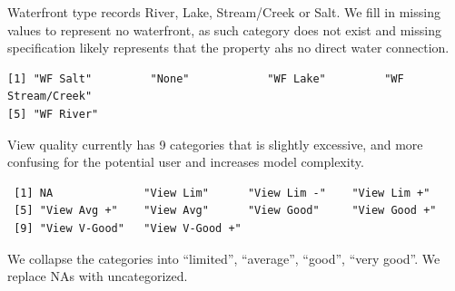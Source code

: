 \documentclass[
  english,
  letterpaper,
  DIV=11,
  numbers=noendperiod]{scrreprt}
\newenvironment{Shaded}{\begin{snugshade}}{\end{snugshade}}
\newcommand{\AttributeTok}[1]{\textcolor[rgb]{0.40,0.45,0.13}{#1}}
\newcommand{\FunctionTok}[1]{\textcolor[rgb]{0.28,0.35,0.67}{#1}}
\newcommand{\NormalTok}[1]{\textcolor[rgb]{0.00,0.23,0.31}{#1}}
\newcommand{\OtherTok}[1]{\textcolor[rgb]{0.00,0.23,0.31}{#1}}
\newcommand{\SpecialCharTok}[1]{\textcolor[rgb]{0.37,0.37,0.37}{#1}}
\newcommand{\StringTok}[1]{\textcolor[rgb]{0.13,0.47,0.30}{#1}}
\begin{document}
Waterfront type records River, Lake, Stream/Creek or Salt. We fill in
missing values to represent no waterfront, as such category does not
exist and missing specification likely represents that the property ahs
no direct water connection.

\begin{Shaded}
\end{Shaded}

\begin{verbatim}
[1] "WF Salt"         "None"            "WF Lake"         "WF Stream/Creek"
[5] "WF River"       
\end{verbatim}

View quality currently has 9 categories that is slightly excessive, and
more confusing for the potential user and increases model complexity.

\begin{Shaded}
\end{Shaded}

\begin{verbatim}
 [1] NA              "View Lim"      "View Lim -"    "View Lim +"   
 [5] "View Avg +"    "View Avg"      "View Good"     "View Good +"  
 [9] "View V-Good"   "View V-Good +"
\end{verbatim}

We collapse the categories into ``limited'', ``average'', ``good'',
``very good''. We replace NAs with uncategorized.
\end{document}
